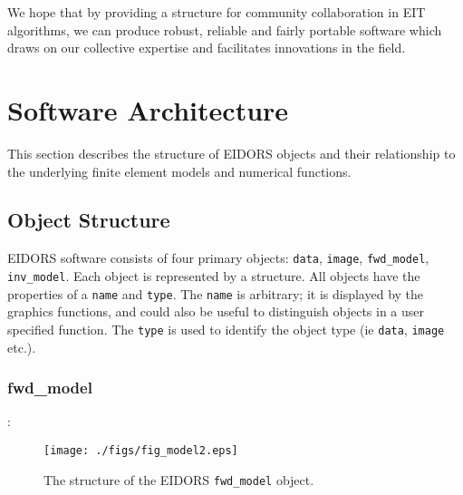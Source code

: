 \documentclass[12pt]{iopart}
\begin{document}
\begin{itemize}
%

\end{itemize}
We hope that by providing a structure for community collaboration
in EIT algorithms, we can produce robust,
reliable and fairly portable software which draws on our collective
expertise and facilitates innovations in the field.

\section{Software Architecture}

This section describes the structure of EIDORS objects
and their relationship to the underlying finite element
models and numerical functions.

\subsection{Object Structure}

EIDORS software consists of four primary objects:
{\tt data},
{\tt image},
{\tt fwd\_model},
{\tt inv\_model}. Each object is represented by a
structure. All objects have the properties of a
{\tt name} and {\tt type}. The {\tt name} is
arbitrary; it is displayed by the graphics functions,
and could also be useful to distinguish objects
in a user specified function.
The {\tt type} is used to identify the object type 
(ie {\tt data}, {\tt image} etc.).

\subsubsection{fwd\_model}:

%
%
\begin{figure}[th]
\begin{flushright}
\texttt{[image: ./figs/fig\_model2.eps]}
\caption{\small The structure of the EIDORS {\tt fwd\_model} object.
\label{fig:fwd_model}
 }
\end{flushright}
\end{figure}
\end{document}
